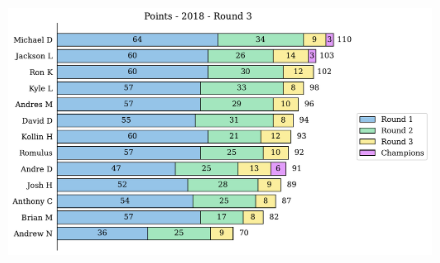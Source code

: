 \documentclass[10pt]{article}
\begin{document}
\begin{minipage}[t]{13cm}
    \begin{figure}[H]
        \vspace{-3.5cm}
        \includegraphics[width=12cm]{../../figures/2018/Points-2018-Round3.pdf}
    \end{figure}
\end{minipage}
\end{document}
